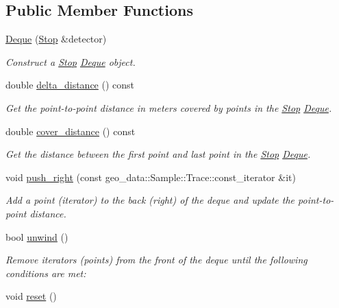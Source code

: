 \subsection*{Public Member Functions}
\begin{DoxyCompactItemize}
\item 
\hyperlink{classcvdi_1_1Stop_1_1Deque_a82db9db1295a1d0470e5a2ae5fdceab1}{Deque} (\hyperlink{classcvdi_1_1Stop}{Stop} \&detector)
\begin{DoxyCompactList}\small\item\em Construct a \hyperlink{classcvdi_1_1Stop}{Stop} \hyperlink{classcvdi_1_1Stop_1_1Deque}{Deque} object. \end{DoxyCompactList}\item 
double \hyperlink{classcvdi_1_1Stop_1_1Deque_af2be913dfab359504aaebc7620d7399b}{delta\+\_\+distance} () const 
\begin{DoxyCompactList}\small\item\em Get the point-\/to-\/point distance in meters covered by points in the \hyperlink{classcvdi_1_1Stop}{Stop} \hyperlink{classcvdi_1_1Stop_1_1Deque}{Deque}. \end{DoxyCompactList}\item 
double \hyperlink{classcvdi_1_1Stop_1_1Deque_ae6b2b3fccac30fe6112ff6da6aafcd90}{cover\+\_\+distance} () const 
\begin{DoxyCompactList}\small\item\em Get the distance between the first point and last point in the \hyperlink{classcvdi_1_1Stop}{Stop} \hyperlink{classcvdi_1_1Stop_1_1Deque}{Deque}. \end{DoxyCompactList}\item 
void \hyperlink{classcvdi_1_1Stop_1_1Deque_ad277103300d4fc3a09afbe0b575a4567}{push\+\_\+right} (const geo\+\_\+data\+::\+Sample\+::\+Trace\+::const\+\_\+iterator \&it)
\begin{DoxyCompactList}\small\item\em Add a point (iterator) to the back (right) of the deque and update the point-\/to-\/point distance. \end{DoxyCompactList}\item 
bool \hyperlink{classcvdi_1_1Stop_1_1Deque_aab0122a2992c126d1ccc9e6b5dfd04f9}{unwind} ()
\begin{DoxyCompactList}\small\item\em Remove iterators (points) from the front of the deque until the following conditions are met\+: \end{DoxyCompactList}\item 
void \hyperlink{classcvdi_1_1Stop_1_1Deque_a07479bd54399d00d977965de4608f57d}{reset} ()\hypertarget{classcvdi_1_1Stop_1_1Deque_a07479bd54399d00d977965de4608f57d}{}\label{classcvdi_1_1Stop_1_1Deque_a07479bd54399d00d977965de4608f57d}


\end{DoxyCompactItemize}
